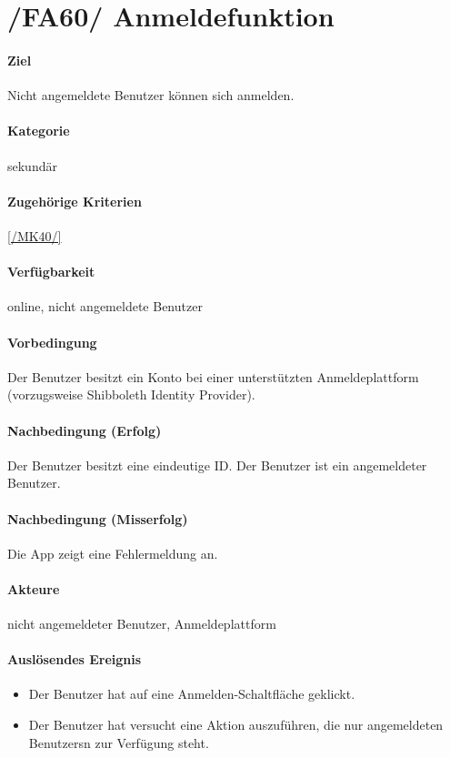 \section[Anmeldefunktion]{/FA60/ Anmeldefunktion}
\label{/FA60/}
\paragraph{Ziel}
Nicht angemeldete \Gls{Benutzer} können sich anmelden.
\paragraph{Kategorie}
sekundär
\paragraph{Zugehörige Kriterien}
\ref{/MK40/}
\paragraph{Verfügbarkeit}
online, nicht angemeldete Benutzer
\paragraph{Vorbedingung}
Der \Gls{Benutzer} besitzt ein Konto bei einer unterstützten Anmeldeplattform (vorzugsweise Shibboleth Identity Provider).
\paragraph{Nachbedingung (Erfolg)}
Der \Gls{Benutzer} besitzt eine eindeutige \Gls{ID}. Der \Gls{Benutzer} ist ein \dq angemeldeter \Gls{Benutzer}\dq{}.
\paragraph{Nachbedingung (Misserfolg)}
Die App zeigt eine Fehlermeldung an.
\paragraph{Akteure}
nicht angemeldeter \Gls{Benutzer}, Anmeldeplattform
\paragraph{Auslösendes Ereignis}
\begin{itemize}
      \item Der \Gls{Benutzer} hat auf eine \dq Anmelden\dq{}-Schaltfläche geklickt.
      \item Der \Gls{Benutzer} hat versucht eine Aktion auszuführen, die nur angemeldeten \Glspl{Benutzer}n zur Verfügung steht.
\end{itemize}
